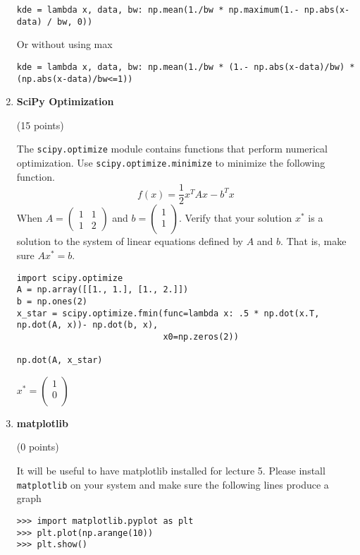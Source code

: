 \documentclass{article}
\newcounter{points}
\newcommand\setpoints[1]{\addtocounter{points}{#1}(#1 points)}
\newcommand\printpoints{Total number of points: \value{\thepoints}}
\begin{document}
\begin{enumerate}
\texttt{kde = lambda x, data, bw: np.mean(1./bw * np.maximum(1.- np.abs(x-data) / bw, 0)) }

Or without using max

\texttt{kde = lambda x, data, bw: np.mean(1./bw * (1.- np.abs(x-data)/bw) * (np.abs(x-data)/bw<=1))}


\item \textbf{SciPy Optimization} \setpoints{15}

The \texttt{scipy.optimize} module contains functions that perform numerical optimization. Use \newline
\texttt{scipy.optimize.minimize} to minimize the following function. 
$$f(x) = \frac{1}{2}x^TAx - b^Tx$$
When 
$A= \begin{pmatrix}
1 & 1\\
1 & 2
\end{pmatrix}$
and $b = \begin{pmatrix}
1 \\
1 \\
\end{pmatrix}$.
Verify that your solution $x^*$ is a solution to the system of linear equations defined by $A$ and $b$. That is, make sure $Ax^*=b$.

\begin{verbatim}
import scipy.optimize
A = np.array([[1., 1.], [1., 2.]])
b = np.ones(2)
x_star = scipy.optimize.fmin(func=lambda x: .5 * np.dot(x.T, np.dot(A, x))- np.dot(b, x),
                             x0=np.zeros(2))

np.dot(A, x_star)                                 
\end{verbatim}
$x^* =  \begin{pmatrix}
1 \\
0 \\
\end{pmatrix}$

\item \textbf{matplotlib} \setpoints{0}

It will be useful to have matplotlib installed for lecture 5. Please install \texttt{matplotlib} on your system and make sure the following lines produce a graph 
\begin{verbatim}
>>> import matplotlib.pyplot as plt
>>> plt.plot(np.arange(10))
>>> plt.show()
\end{verbatim}
\end{enumerate}
\end{document}
